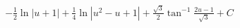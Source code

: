 \documentclass[preview]{standalone}
\begin{document}
\begin{align*}
-\frac{1}{2}\ln|u+1|+\frac{1}{4}\ln|u^2-u+1|+\frac{\sqrt3}{2}\tan^{-1}\frac{2u-1}{\sqrt3}+C
\end{align*}
\end{document}
